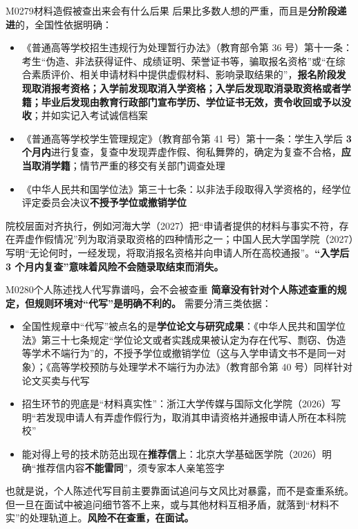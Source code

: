 \begin{qa}{M0279}{材料造假被查出来会有什么后果}
后果比多数人想的严重，而且是\textbf{分阶段递进}的，全国性依据明确：

\begin{itemize}
  \item 《普通高等学校招生违规行为处理暂行办法》（教育部令第 36 号）第十一条：考生“伪造、非法获得证件、成绩证明、荣誉证书等，骗取报名资格”或“在综合素质评价、相关申请材料中提供虚假材料、影响录取结果的”，\textbf{报名阶段发现取消报考资格；入学前发现取消入学资格；入学后发现取消录取资格或者学籍；毕业后发现由教育行政部门宣布学历、学位证书无效，责令收回或予以没收}；并如实记入考试诚信档案
  \item 《普通高等学校学生管理规定》（教育部令第 41 号）第十一条：学生入学后 \textbf{3 个月内}进行复查，复查中发现弄虚作假、徇私舞弊的，确定为复查不合格，\textbf{应当取消学籍}；情节严重的移交有关部门调查处理
  \item 《中华人民共和国学位法》第三十七条：以非法手段取得入学资格的，经学位评定委员会决议\textbf{不授予学位或撤销学位}
\end{itemize}

院校层面对齐执行，例如河海大学（2027）把“申请者提供的材料与事实不符，存在弄虚作假情况”列为取消录取资格的四种情形之一；中国人民大学国学院（2027）写明“无论何时，一经发现，将取消报名资格并向申请人所在高校通报”。\textbf{“入学后 3 个月内复查”意味着风险不会随录取结束而消失。}
\end{qa}

\begin{qa}{M0280}{个人陈述找人代写靠谱吗，会不会被查重}
\textbf{简章没有针对个人陈述查重的规定，但规则环境对“代写”是明确不利的。} 需要分清三类依据：

\begin{itemize}
  \item 全国性规章中“代写”被点名的是\textbf{学位论文与研究成果}：《中华人民共和国学位法》第三十七条规定“学位论文或者实践成果被认定为存在代写、剽窃、伪造等学术不端行为”的，不授予学位或撤销学位（这与入学申请文书不是同一对象）；《高等学校预防与处理学术不端行为办法》（教育部令第 40 号）同样针对论文买卖与代写
  \item 招生环节的兜底是“材料真实性”：浙江大学传媒与国际文化学院（2026）写明“若发现申请人有弄虚作假行为，取消其申请资格并通报申请人所在本科院校”
  \item 能对得上号的技术防范出现在\textbf{推荐信}上：北京大学基础医学院（2026）明确“推荐信内容\textbf{不能雷同}”，须专家本人亲笔签字
\end{itemize}

也就是说，个人陈述代写目前主要靠面试追问与文风比对暴露，而不是查重系统。但一旦在面试中被追问细节答不上来，或与其他材料互相矛盾，就落到“材料不实”的处理轨道上。\textbf{风险不在查重，在面试。}
\end{qa}

